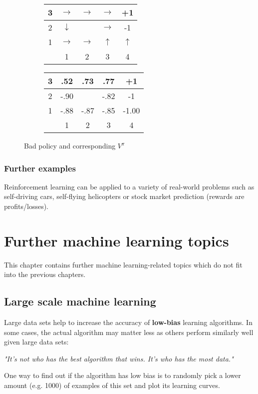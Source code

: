 \documentclass{report}
\begin{document}
\begin{figure}[h!]
\centering
\begin{subfigure}[b]{0.4\textwidth}
\begin{tabular}{c|c|c|c|c|}
\hline
3 & $\rightarrow$ & $\rightarrow$ & $\rightarrow$ & +1 \\
\hline
2 & $\downarrow$ & \cellcolor{black} & $\rightarrow$ & -1 \\
\hline
1 & $\rightarrow$ & $\rightarrow$ & $\uparrow$ & $\uparrow$ \\
\hline
& 1 & 2 & 3 & 4 \\
\end{tabular}
\end{subfigure}
\begin{subfigure}[b]{0.4\textwidth}
\begin{tabular}{c|c|c|c|c|}
\hline
3 & .52 & .73 & .77 & +1 \\
\hline
2 & -.90 &\cellcolor{black} & -.82 & -1 \\
\hline
1 & -.88 & -.87 & -.85 & -1.00 \\
\hline
& 1 & 2 & 3 & 4 \\
\end{tabular}
\end{subfigure}
\caption{Bad policy and corresponding $V^{\pi}$}
\label{ref:sampleworldoptimalpolicy1}
\end{figure}

\subsection{Further examples}
Reinforcement learning can be applied to a variety of real-world problems such as self-driving cars, self-flying helicopters or stock market prediction (rewards are profits/losses).


\chapter{Further machine learning topics}
This chapter contains further machine learning-related topics which do not fit into the previous chapters.

\section{Large scale machine learning}
Large data sets  help to increase the accuracy of {\bf low-bias} learning algorithms. In some cases, the actual algorithm may matter less as others perform similarly well given large data sets:
\begin{center}
\em{"It's not who has the best algorithm that wins. It's who has the most data."}
\end{center}
One way to find out if the algorithm has low bias is to randomly pick a lower amount (e.g. 1000) of  examples of this set and plot its learning curves.
\end{document}
